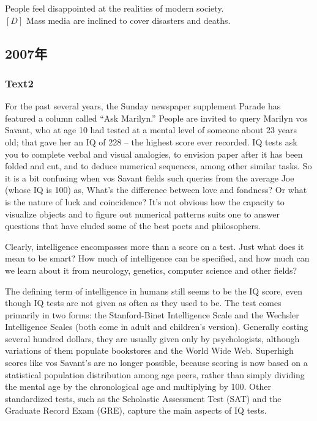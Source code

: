 \documentclass[a4paper]{article}
\begin{document}
People feel disappointed at the realities of modern society.\\$[D]$ Mass media are inclined to cover disasters and deaths.\\\subsection{2007年}
\subsubsection{Text2}

\par
For the past several years, the Sunday newspaper supplement Parade has featured a column called “Ask Marilyn.” People are invited to query Marilyn vos Savant, who at age 10 had tested at a mental level of someone about 23 years old; that gave her an IQ of 228 – the highest score ever recorded. IQ tests ask you to complete verbal and visual analogies, to envision paper after it has been folded and cut, and to deduce numerical sequences, among other similar tasks. So it is a bit confusing when vos Savant fields such queries from the average Joe (whose IQ is 100) as, What’s the difference between love and fondness? Or what is the nature of luck and coincidence? It’s not obvious how the capacity to visualize objects and to figure out numerical patterns suits one to answer questions that have eluded some of the best poets and philosophers.

\par
Clearly, intelligence encompasses more than a score on a test. Just what does it mean to be smart? How much of intelligence can be specified, and how much can we learn about it from neurology, genetics, computer science and other fields?

\par
The defining term of intelligence in humans still seems to be the IQ score, even though IQ tests are not given as often as they used to be. The test comes primarily in two forms: the Stanford-Binet Intelligence Scale and the Wechsler Intelligence Scales (both come in adult and children’s version). Generally costing several hundred dollars, they are usually given only by psychologists, although variations of them populate bookstores and the World Wide Web. Superhigh scores like vos Savant’s are no longer possible, because scoring is now based on a statistical population distribution among age peers, rather than simply dividing the mental age by the chronological age and multiplying by 100. Other standardized tests, such as the Scholastic Assessment Test (SAT) and the Graduate Record Exam (GRE), capture the main aspects of IQ tests.
\end{document}

